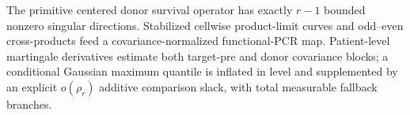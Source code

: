The primitive centered donor survival operator has exactly \(r-1\) bounded nonzero singular directions. Stabilized cellwise product-limit curves and odd--even cross-products feed a covariance-normalized functional-PCR map. Patient-level martingale derivatives estimate both target-pre and donor covariance blocks; a conditional Gaussian maximum quantile is inflated in level and supplemented by an explicit \(o(\rho_r)\) additive comparison slack, with total measurable fallback branches.